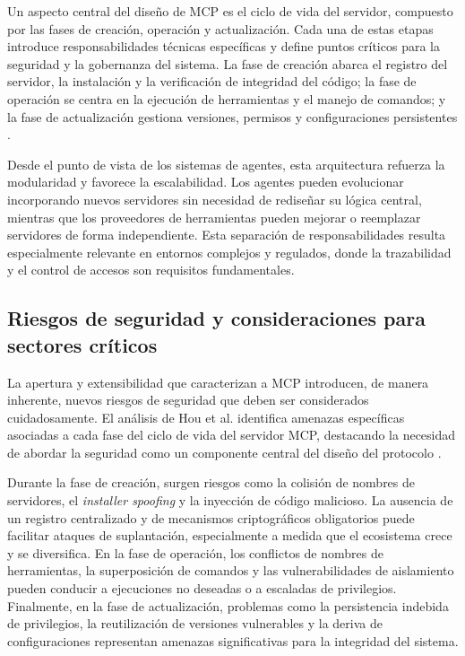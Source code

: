 \documentclass[
	spanish, %
	letterpaper, oneside
]{book}
\begin{document}
Un aspecto central del diseño de MCP es el ciclo de vida del servidor, compuesto por las fases de creación, operación y actualización. Cada una de estas etapas introduce responsabilidades técnicas específicas y define puntos críticos para la seguridad y la gobernanza del sistema. La fase de creación abarca el registro del servidor, la instalación y la verificación de integridad del código; la fase de operación se centra en la ejecución de herramientas y el manejo de comandos; y la fase de actualización gestiona versiones, permisos y configuraciones persistentes \cite{hou2025mcp}.

Desde el punto de vista de los sistemas de agentes, esta arquitectura refuerza la modularidad y favorece la escalabilidad. Los agentes pueden evolucionar incorporando nuevos servidores sin necesidad de rediseñar su lógica central, mientras que los proveedores de herramientas pueden mejorar o reemplazar servidores de forma independiente. Esta separación de responsabilidades resulta especialmente relevante en entornos complejos y regulados, donde la trazabilidad y el control de accesos son requisitos fundamentales.

\subsection{Riesgos de seguridad y consideraciones para sectores críticos}

La apertura y extensibilidad que caracterizan a MCP introducen, de manera inherente, nuevos riesgos de seguridad que deben ser considerados cuidadosamente. El análisis de Hou et al. identifica amenazas específicas asociadas a cada fase del ciclo de vida del servidor MCP, destacando la necesidad de abordar la seguridad como un componente central del diseño del protocolo \cite{hou2025mcp}.

Durante la fase de creación, surgen riesgos como la colisión de nombres de servidores, el \emph{installer spoofing} y la inyección de código malicioso. La ausencia de un registro centralizado y de mecanismos criptográficos obligatorios puede facilitar ataques de suplantación, especialmente a medida que el ecosistema crece y se diversifica. En la fase de operación, los conflictos de nombres de herramientas, la superposición de comandos y las vulnerabilidades de aislamiento pueden conducir a ejecuciones no deseadas o a escaladas de privilegios. Finalmente, en la fase de actualización, problemas como la persistencia indebida de privilegios, la reutilización de versiones vulnerables y la deriva de configuraciones representan amenazas significativas para la integridad del sistema.
\end{document}
